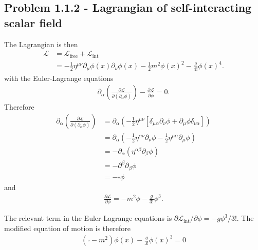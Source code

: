 \documentclass[10pt,a4paper]{book}
\theoremstyle{definition}
\begin{document}
\subsection{Problem 1.1.2 - Lagrangian of self-interacting scalar field}
The Lagrangian is then
\begin{align}
    \mathcal{L}&=\mathcal{L}_\text{free}+\mathcal{L}_\text{int}\\
                &=-\frac{1}{2}\eta^{\mu\nu}\partial_\mu\phi(x)\partial_\nu\phi(x)-\frac{1}{2}m^2\phi(x)^2-\frac{g}{4!}\phi(x)^4.
\end{align}
with the Euler-Lagrange equations
\begin{align}
    \partial_\alpha\left(\frac{\partial\mathcal{L}}{\partial(\partial_\alpha\phi)}\right)-\frac{\partial\mathcal{L}}{\partial\phi}=0.
\end{align}
Therefore
\begin{align}
    \partial_\alpha\left(\frac{\partial\mathcal{L}}{\partial(\partial_\alpha\phi)}\right)
    &=\partial_\alpha\left(-\frac{1}{2}\eta^{\mu\nu}[\delta_{\mu\alpha}\partial_\nu\phi+\partial_\mu\phi\delta_{\nu\alpha}]\right)\\
    &=\partial_\alpha\left(-\frac{1}{2}\eta^{\alpha\nu}\partial_\nu\phi-\frac{1}{2}\eta^{\mu\alpha}\partial_\mu\phi\right)\\
    &=-\partial_\alpha\left(\eta^{\alpha\beta}\partial_\beta\phi\right)\\
    &=-\partial^\beta\partial_\beta\phi\\
    &=-\square\phi
\end{align}
and
\begin{align}
    \frac{\partial\mathcal{L}}{\partial\phi} = -m^2\phi-\frac{g}{3!}\phi^3.
\end{align}

The relevant term in the Euler-Lagrange equations is $\partial\mathcal{L}_\text{int}/\partial\phi=-g\phi^3/3!$. The modified equation of motion is therefore
\begin{align}
    (\square - m^2)\phi(x)-\frac{g}{3!}\phi(x)^3=0
\end{align}
\end{document}

